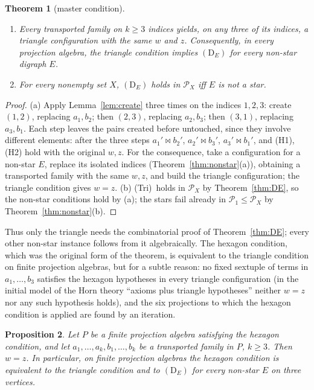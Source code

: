 \documentclass[11pt]{amsart}
\newtheorem{theorem}{Theorem}[section]
\newtheorem{proposition}[theorem]{Proposition}
\theoremstyle{definition}
\renewcommand{\P}{\mathcal{P}}      %
\newcommand{\mt}{\bowtie}      %
\newcommand{\Tri}{\textup{(Tri)}}
\begin{document}
\begin{theorem}[master condition]\label{thm:master}
\begin{enumerate}[label=\textup{(\alph*)}]
\item Every transported family on $k\ge3$ indices yields, on any three of its indices, a triangle configuration with the same $w$ and $z$. Consequently, in every projection algebra, the triangle condition implies $(\mathrm D_E)$ for every non-star digraph $E$.
\item For every nonempty set $X$, $(\mathrm D_E)$ holds in $\P_X$ iff $E$ is not a star.
\end{enumerate}
\end{theorem}

\begin{proof}
(a) Apply Lemma~\ref{lem:create} three times on the indices $1,2,3$: create $(1,2)$, replacing $a_1,b_2$; then $(2,3)$, replacing $a_2,b_3$; then $(3,1)$, replacing $a_3,b_1$. Each step leaves the pairs created before untouched, since they involve different elements: after the three steps $a_1'\mt b_2'$, $a_2'\mt b_3'$, $a_3'\mt b_1'$, and (H1), (H2) hold with the original $w,z$. For the consequence, take a configuration for a non-star $E$, replace its isolated indices (Theorem~\ref{thm:nonstar}(a)), obtaining a transported family with the same $w,z$, and build the triangle configuration; the triangle condition gives $w=z$. (b) \Tri\ holds in $\P_X$ by Theorem~\ref{thm:DE}, so the non-star conditions hold by (a); the stars fail already in $\P_1\le\P_X$ by Theorem~\ref{thm:nonstar}(b).
\end{proof}

Thus only the triangle needs the combinatorial proof of Theorem~\ref{thm:DE}; every other non-star instance follows from it algebraically. The hexagon condition, which was the original form of the theorem, is equivalent to the triangle condition on finite projection algebras, but for a subtle reason: no fixed sextuple of terms in $a_1,\dots,b_3$ satisfies the hexagon hypotheses in every triangle configuration (in the initial model of the Horn theory ``axioms plus triangle hypotheses'' neither $w=z$ nor any such hypothesis holds), and the six projections to which the hexagon condition is applied are found by an iteration.

\begin{proposition}\label{prop:equiv}
Let $P$ be a finite projection algebra satisfying the hexagon condition, and let $a_1,\dots,a_k,b_1,\dots,b_k$ be a transported family in $P$, $k\ge3$. Then $w=z$. In particular, on finite projection algebras the hexagon condition is equivalent to the triangle condition and to $(\mathrm D_E)$ for every non-star $E$ on three vertices.
\end{proposition}
\end{document}
